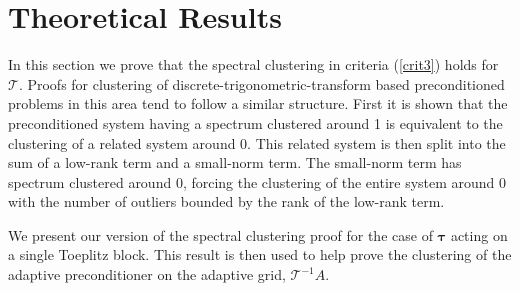 \documentclass[review]{siamart251216}
\newcommand{\R}{{\mathbb{R}}}
\renewcommand{\vec}[1]{{{\mathbf{#1}}}}
\newcommand{\zero}{{\vec  0 }}
\newcommand{\A}{{A }}
\newcommand{\Tau}{\mathcal{T}}
\newcommand{\ptau}{{\bm{\tau}}}
\begin{document}
\section{Theoretical Results} 
In this section we prove that the spectral clustering in criteria (\ref{crit3}) holds for $\Tau$. Proofs for clustering of discrete-trigonometric-transform based preconditioned problems in this area tend to follow a similar structure. First it is shown that the preconditioned system having a spectrum clustered around 1 is equivalent to the clustering of a related system around 0. This related system is then split into the sum of a low-rank term and a small-norm term. The small-norm term has spectrum clustered around 0, forcing the clustering of the entire system around 0 with the number of outliers bounded by the rank of the low-rank term.

We present our version of the spectral clustering proof for the case of $\ptau$ acting on a single Toeplitz block. This result is then used to help prove the clustering of the adaptive preconditioner on the adaptive grid, $\Tau^{-1} \A$. 

\end{document}
